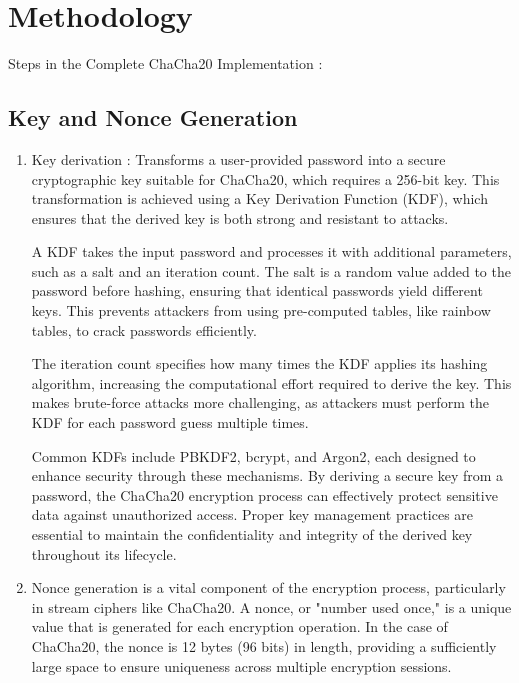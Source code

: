 \documentclass[a4paper,12pt]{report}
\begin{document}
\chapter{Methodology}

Steps in the Complete ChaCha20 Implementation :

\section{Key and Nonce Generation}
\begin{enumerate}
    \item Key derivation : Transforms a user-provided password into a secure cryptographic key suitable for ChaCha20, which requires a 256-bit key.
    This transformation is achieved using a Key Derivation Function (KDF), which ensures that the derived key is both strong and resistant to attacks.

    A KDF takes the input password and processes it with additional parameters, such as a salt and an iteration count.
    The salt is a random value added to the password before hashing, ensuring that identical passwords yield different keys.
    This prevents attackers from using pre-computed tables, like rainbow tables, to crack passwords efficiently.

    The iteration count specifies how many times the KDF applies its hashing algorithm, increasing the computational effort required to derive the key.
    This makes brute-force attacks more challenging, as attackers must perform the KDF for each password guess multiple times.

    Common KDFs include PBKDF2, bcrypt, and Argon2, each designed to enhance security through these mechanisms.
    By deriving a secure key from a password, the ChaCha20 encryption process can effectively protect sensitive data against unauthorized access.
    Proper key management practices are essential to maintain the confidentiality and integrity of the derived key throughout its lifecycle.
    \item Nonce generation is a vital component of the encryption process, particularly in stream ciphers like ChaCha20.
    A nonce, or "number used once," is a unique value that is generated for each encryption operation.
    In the case of ChaCha20, the nonce is 12 bytes (96 bits) in length, providing a sufficiently large space to ensure uniqueness across multiple encryption sessions.


\end{enumerate}
\end{document}
